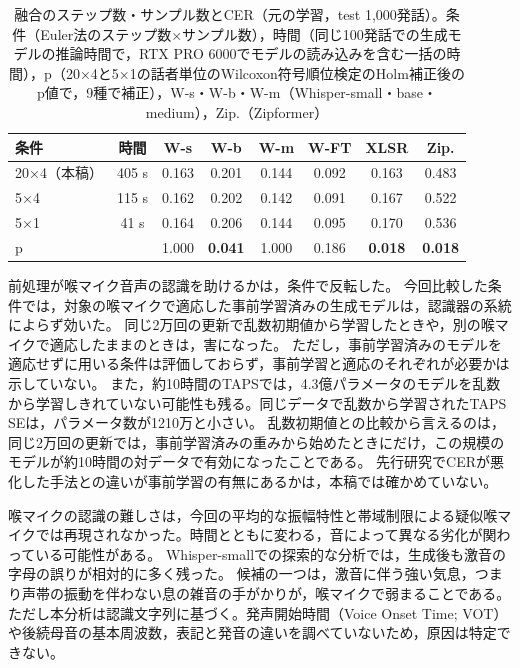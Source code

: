 \documentclass[xelatex,ja=standard,a4paper,twocolumn,10pt]{bxjsarticle}
\makeatletter
\renewcommand{\section}{\@startsection{section}{1}{\z@}{1.0ex plus .3ex}{.5ex}{\normalfont\large\sffamily\bfseries}}
\makeatother
\begin{document}
\begin{table}[t]
  \centering
  \caption{融合のステップ数・サンプル数とCER（元の学習，test 1,000発話）。条件（Euler法のステップ数×サンプル数），時間（同じ100発話での生成モデルの推論時間で，RTX PRO 6000でモデルの読み込みを含む一括の時間），p（20×4と5×1の話者単位のWilcoxon符号順位検定のHolm補正後のp値で，9種で補正），W-s・W-b・W-m（Whisper-small・base・medium），Zip.（Zipformer）}
  \label{tab:steps}
  \footnotesize
  \setlength{\tabcolsep}{1.6pt}
  \begin{tabular}{lccccccc}
    \toprule
    条件 & 時間 & W-s & W-b & W-m & W-FT & XLSR & Zip. \\
    \midrule
    20×4（本稿） & 405 s & 0.163 & 0.201 & 0.144 & 0.092 & 0.163 & 0.483 \\
    5×4 & 115 s & 0.162 & 0.202 & 0.142 & 0.091 & 0.167 & 0.522 \\
    5×1 & 41 s & 0.164 & 0.206 & 0.144 & 0.095 & 0.170 & 0.536 \\
    p & & 1.000 & \textbf{0.041} & 1.000 & 0.186 & \textbf{0.018} & \textbf{0.018} \\
    \bottomrule
  \end{tabular}
\end{table}

\section{考察と限界}
前処理が喉マイク音声の認識を助けるかは，条件で反転した。
今回比較した条件では，対象の喉マイクで適応した事前学習済みの生成モデルは，認識器の系統によらず効いた。
同じ2万回の更新で乱数初期値から学習したときや，別の喉マイクで適応したままのときは，害になった。
ただし，事前学習済みのモデルを適応せずに用いる条件は評価しておらず，事前学習と適応のそれぞれが必要かは示していない。
また，約10時間のTAPSでは，4.3億パラメータのモデルを乱数から学習しきれていない可能性も残る。同じデータで乱数から学習されたTAPS SEは，パラメータ数が1210万と小さい。
乱数初期値との比較から言えるのは，同じ2万回の更新では，事前学習済みの重みから始めたときにだけ，この規模のモデルが約10時間の対データで有効になったことである。
先行研究\cite{yamanaka2026}でCERが悪化した手法との違いが事前学習の有無にあるかは，本稿では確かめていない。

喉マイクの認識の難しさは，今回の平均的な振幅特性と帯域制限による疑似喉マイクでは再現されなかった。時間とともに変わる，音によって異なる劣化が関わっている可能性がある。
Whisper-smallでの探索的な分析では，生成後も激音の字母の誤りが相対的に多く残った。
候補の一つは，激音に伴う強い気息，つまり声帯の振動を伴わない息の雑音の手がかりが，喉マイクで弱まることである。
ただし本分析は認識文字列に基づく。発声開始時間（Voice Onset Time; VOT）や後続母音の基本周波数，表記と発音の違いを調べていないため，原因は特定できない。
\end{document}
